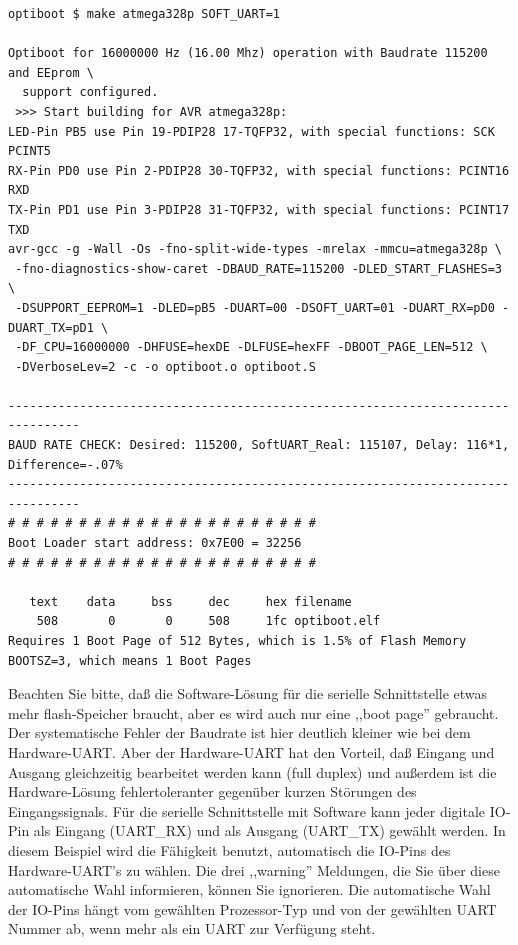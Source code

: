 \begin{verbatim}
optiboot $ make atmega328p SOFT_UART=1

Optiboot for 16000000 Hz (16.00 Mhz) operation with Baudrate 115200 and EEprom \
  support configured.
 >>> Start building for AVR atmega328p:
LED-Pin PB5 use Pin 19-PDIP28 17-TQFP32, with special functions: SCK PCINT5
RX-Pin PD0 use Pin 2-PDIP28 30-TQFP32, with special functions: PCINT16 RXD
TX-Pin PD1 use Pin 3-PDIP28 31-TQFP32, with special functions: PCINT17 TXD
avr-gcc -g -Wall -Os -fno-split-wide-types -mrelax -mmcu=atmega328p \
 -fno-diagnostics-show-caret -DBAUD_RATE=115200 -DLED_START_FLASHES=3 \
 -DSUPPORT_EEPROM=1 -DLED=pB5 -DUART=00 -DSOFT_UART=01 -DUART_RX=pD0 -DUART_TX=pD1 \
 -DF_CPU=16000000 -DHFUSE=hexDE -DLFUSE=hexFF -DBOOT_PAGE_LEN=512 \
 -DVerboseLev=2 -c -o optiboot.o optiboot.S

--------------------------------------------------------------------------------
BAUD RATE CHECK: Desired: 115200, SoftUART_Real: 115107, Delay: 116*1, Difference=-.07%
--------------------------------------------------------------------------------
# # # # # # # # # # # # # # # # # # # # # #
Boot Loader start address: 0x7E00 = 32256
# # # # # # # # # # # # # # # # # # # # # #

   text	   data	    bss	    dec	    hex	filename
    508	      0	      0	    508	    1fc	optiboot.elf
Requires 1 Boot Page of 512 Bytes, which is 1.5% of Flash Memory
BOOTSZ=3, which means 1 Boot Pages

\end{verbatim}

Beachten Sie bitte, daß die Software-Lösung für die serielle Schnittstelle etwas mehr flash-Speicher braucht,
aber es wird auch nur eine ,,boot page'' gebraucht. Der systematische Fehler der Baudrate ist hier deutlich kleiner
wie bei dem Hardware-UART.
Aber der Hardware-UART hat den Vorteil, daß Eingang und Ausgang gleichzeitig bearbeitet werden kann (full duplex) und 
außerdem ist die Hardware-Lösung fehlertoleranter gegenüber kurzen Störungen des Eingangssignals.
Für die serielle Schnittstelle mit Software kann jeder digitale IO-Pin als Eingang (UART\_RX) und als Ausgang (UART\_TX)
gewählt werden. In diesem Beispiel wird die Fähigkeit benutzt, automatisch die IO-Pins des Hardware-UART's zu wählen.
Die drei ,,warning'' Meldungen, die Sie über diese automatische Wahl informieren, können Sie ignorieren.
Die automatische Wahl der IO-Pins hängt vom gewählten Prozessor-Typ und von der gewählten UART Nummer ab,
wenn mehr als ein UART zur Verfügung steht.

